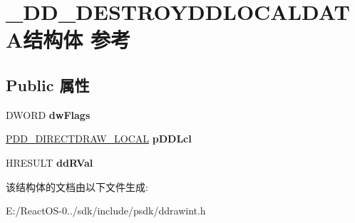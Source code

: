 \hypertarget{struct___d_d___d_e_s_t_r_o_y_d_d_l_o_c_a_l_d_a_t_a}{}\section{\+\_\+\+D\+D\+\_\+\+D\+E\+S\+T\+R\+O\+Y\+D\+D\+L\+O\+C\+A\+L\+D\+A\+T\+A结构体 参考}
\label{struct___d_d___d_e_s_t_r_o_y_d_d_l_o_c_a_l_d_a_t_a}
\subsection*{Public 属性}
\begin{DoxyCompactItemize}
\item 
\mbox{\label{struct___d_d___d_e_s_t_r_o_y_d_d_l_o_c_a_l_d_a_t_a_a6117648280157e50b51c7d30948c14d4}} 
D\+W\+O\+RD {\bfseries dw\+Flags}
\item 
\mbox{\label{struct___d_d___d_e_s_t_r_o_y_d_d_l_o_c_a_l_d_a_t_a_aa6d0266d43491384790eec1a2e8138b4}} 
\hyperlink{struct___d_d___d_i_r_e_c_t_d_r_a_w___l_o_c_a_l}{P\+D\+D\+\_\+\+D\+I\+R\+E\+C\+T\+D\+R\+A\+W\+\_\+\+L\+O\+C\+AL} {\bfseries p\+D\+D\+Lcl}
\item 
\mbox{\label{struct___d_d___d_e_s_t_r_o_y_d_d_l_o_c_a_l_d_a_t_a_a4f3bc3a403c3e15bbdca1293d7ff9f22}} 
H\+R\+E\+S\+U\+LT {\bfseries dd\+R\+Val}
\end{DoxyCompactItemize}


该结构体的文档由以下文件生成\+:\begin{DoxyCompactItemize}
\item 
E\+:/\+React\+O\+S-\/0../sdk/include/psdk/ddrawint.\+h\end{DoxyCompactItemize}
